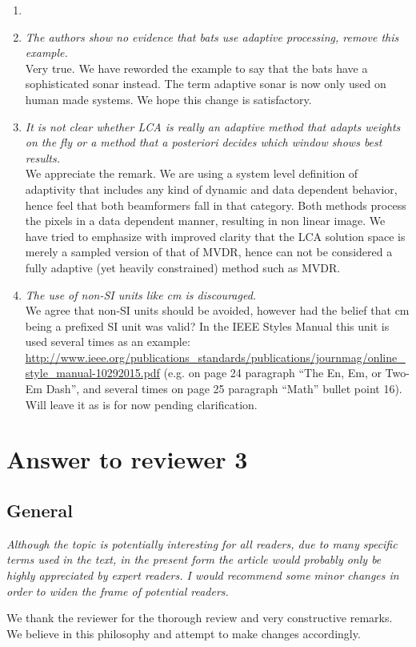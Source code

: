 \documentclass[11pt]{article} %
\newcommand\1{\vec 1}
\newcommand\q[1]{\textit{#1}}
\newcommand\qi[1]{\item\q{#1}}
\newcommand\hi[1]{\item[\textbf{#1}]}
\newcommand\ans[1]{#1}
\newcommand\ai[1]{\\[.5\baselineskip]\ans{#1}}
\begin{document}
\begin{enumerate}
\hi{Introduction}
\qi{The authors show no evidence that bats use adaptive processing, remove this example.}
\ai{Very true. We have reworded the example to say that the bats have a sophisticated sonar instead. The term adaptive sonar is now only used on human made systems. We hope this change is satisfactory. }
%
\qi{It is not clear whether LCA is really an adaptive method that adapts weights on the fly or a method that a posteriori decides which window shows best results.}
\ai{We appreciate the remark. We are using a system level definition of adaptivity that includes any kind of dynamic and data dependent behavior, hence feel that both beamformers fall in that category. Both methods process the pixels in a data dependent manner, resulting in non linear image. We have tried to emphasize with improved clarity that the LCA solution space is merely a sampled version of that of MVDR, hence can not be considered a fully adaptive (yet heavily constrained) method such as MVDR.}
%
\qi{The use of non-SI units like cm is discouraged.}
\ai{We agree that non-SI units should be avoided, however had the belief that cm being a prefixed SI unit was valid? In the IEEE Styles Manual this unit is used several times as an example: 
\url{http://www.ieee.org/publications_standards/publications/journmag/online_style_manual-10292015.pdf} (e.g. on page 24 paragraph ``The En, Em, or Two-Em Dash'', and several times on page 25 paragraph ``Math'' bullet point 16). Will leave it as is for now pending clarification.}
%
\end{enumerate}


\newpage
\section{Answer to reviewer 3}

\subsection*{General}

\q{Although the topic is potentially interesting for all readers, due to many specific terms used in the text, in the present form the article would probably only be highly appreciated by expert readers. I would recommend some minor changes in order to widen the frame of potential readers.}

\ans{We thank the reviewer for the thorough review and very constructive remarks. We believe in this philosophy and attempt to make changes accordingly.}
\end{document}
